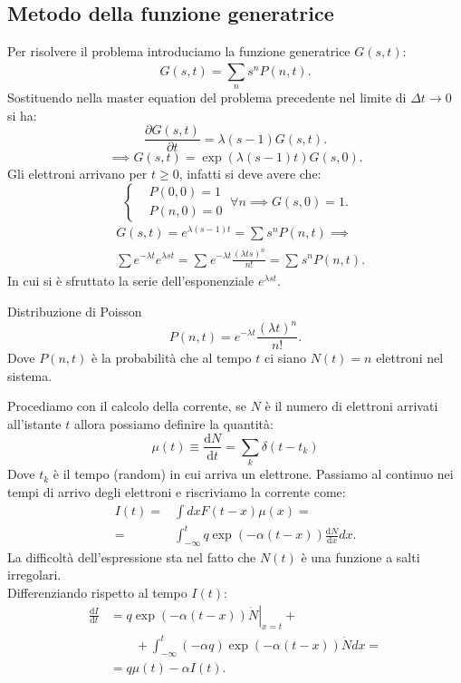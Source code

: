 \subsection{Metodo della funzione generatrice}%
Per risolvere il problema introduciamo la funzione generatrice $G(s,t)$:
\[
    G(s,t) =\sum_{n}^{} s^nP(n,t) 
.\] 
Sostituendo nella master equation del problema precedente nel limite di $\Delta t \to 0$ si ha:
\[
    \frac{\partial G(s,t)}{\partial t} = \lambda (s-1) G(s,t)
.\] 
\[
     \implies  G(s,t) = \exp\left(\lambda (s-1) t\right)G(s,0) 
.\] 
Gli elettroni arrivano per $t\ge 0$, infatti si deve avere che: 
\[
    \begin{cases}
	&P(0,0)=1\\
	&P(n,0) = 0
    \end{cases}
    \ \forall n \implies  G(s,0) = 1 
.\] 
\[\begin{aligned}
    &G(s,t) = e^{\lambda (s-1) t} = \sum_{}^{} s^n P(n,t) \implies  \\
    &\sum e^{-\lambda t} e^{\lambda s t} = \sum_{}^{} e^{-\lambda t}\frac{\left(\lambda ts\right)^n }{n!}  = \sum_{}^{} s^nP(n,t) 
.\end{aligned}\]
In cui si è sfruttato la serie dell'esponenziale $e^{\lambda st}$.
\begin{redbox}{Distribuzione di Poisson}
    \[
	P(n,t)= e^{-\lambda t}\frac{\left(\lambda t\right)^{n}}{n!}
    .\] 
    Dove $P(n,t)$ è la probabilità che al tempo $t$ ci siano $N(t) =n$ elettroni nel sistema.
\end{redbox}
\noindent
Procediamo con il calcolo della corrente, se $N$ è il numero di elettroni arrivati all'istante $t$ allora possiamo definire la quantità:
\[
    \mu(t) \equiv 
    \frac{\text{d} N}{\text{d} t} 
    = \sum_k\delta (t-t_k)  
\] 
Dove $t_k$ è il tempo (random) in cui arriva un elettrone.
Passiamo al continuo nei tempi di arrivo degli elettroni e riscriviamo la corrente come:
\[\begin{aligned}
    I(t) =& \int dx F(t-x) \mu(x) =\\
	 =&\int_{- \infty}^{t} q \exp\left(-\alpha (t-x) \right) \frac{\text{d} N}{\text{d} x} dx 
.\end{aligned}\]
La difficoltà dell'espressione sta nel fatto che $N(t)$ è una funzione a salti irregolari.\\
Differenziando rispetto al tempo $I(t)$:
\[\begin{aligned}
    \frac{\text{d} I}{\text{d} t} &= q\exp\left(-\alpha (t-x)\right)\left.\dot{N}\right|_{x=t} + \\
				   &\qquad +\int_{-\infty}^{t} \left(-\alpha q\right)\exp\left(-\alpha (t-x)\right)\dot{N}dx =\\
				   &= q\mu (t) - \alpha I(t) 
.\end{aligned}\]
